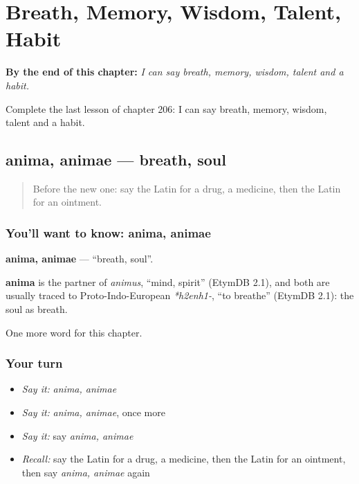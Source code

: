 
\chapter{Breath, Memory, Wisdom, Talent, Habit}
\label{ch:la-breath-memory-wisdom-talent-habit}

\begin{chapteropening}
\textbf{By the end of this chapter:} \emph{I can say breath, memory, wisdom, talent and a habit.}

Complete the last lesson of chapter 206: I can say breath, memory, wisdom, talent and a habit.
\end{chapteropening}

\section[anima, animae]{anima, animae — breath, soul}

\label{lesson:LA-C206-anima}



\begin{quote}
Before the new one: say the Latin for a drug, a medicine, then the Latin for an ointment.
\end{quote}

\subsection*{You'll want to know: anima, animae}
\textbf{anima, animae} — \textquotedblleft{}breath, soul\textquotedblright{}.

\begin{cousinweb}
\textbf{anima} is the partner of \emph{animus}, \textquotedblleft{}mind, spirit\textquotedblright{} (EtymDB 2.1), and both are usually traced to Proto-Indo-European \emph{*h2enh1-}, \textquotedblleft{}to breathe\textquotedblright{} (EtymDB 2.1): the soul as breath.
\end{cousinweb}

\begin{grammarlens}[title={What you've built}]
One more word for this chapter.
\end{grammarlens}

\subsection*{Your turn}
\begin{itemize}
\raggedright
  \item \emph{Say it:} \emph{anima, animae}
  \item \emph{Say it:} \emph{anima, animae}, once more
  \item \emph{Say it:} say \emph{anima, animae}
  \item \emph{Recall:} say the Latin for a drug, a medicine, then the Latin for an ointment, then say \emph{anima, animae} again
\end{itemize}

